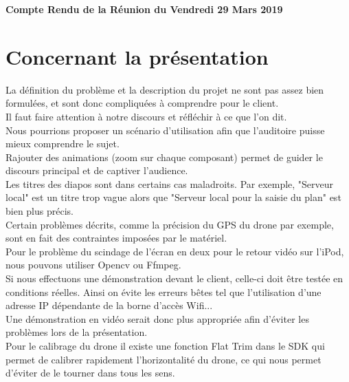 \documentclass[]{article}
\begin{document}
\pagestyle{fancy}
\renewcommand\headrulewidth{1pt}
\renewcommand\footrulewidth{1pt}

\begin{center}
\large{\textbf{Compte Rendu de la Réunion du Vendredi 29 Mars 2019 \bigbreak}}
\end{center}

\section{Concernant la présentation}
La définition du problème et la description du projet ne sont pas assez bien formulées, et sont donc compliquées à comprendre pour le client.\\
Il faut faire attention à notre discours et réfléchir à ce que l'on dit.\\
Nous pourrions proposer un scénario d'utilisation afin que l'auditoire puisse mieux comprendre le sujet.\\
Rajouter des animations (zoom sur chaque composant) permet de guider le discours principal et de captiver l'audience.\\

Les titres des diapos sont dans certains cas maladroits. Par exemple, "Serveur local" est un titre trop vague alors que "Serveur local pour la saisie du plan" est bien plus précis.\\
Certain problèmes décrits, comme la précision du GPS du drone par exemple, sont en fait des contraintes imposées par le matériel.\\
Pour le problème du scindage de l'écran en deux pour le retour vidéo sur l'iPod, nous pouvons utiliser Opencv ou Ffmpeg.\\
Si nous effectuons une démonstration devant le client, celle-ci doit être testée en conditions réelles. Ainsi on évite les erreurs bêtes tel que l'utilisation d'une adresse IP dépendante de la borne d'accès Wifi...\\
Une démonstration en vidéo serait donc plus appropriée afin d'éviter les problèmes lors de la présentation.\\
Pour le calibrage du drone il existe une fonction Flat Trim dans le SDK qui permet de calibrer rapidement l'horizontalité du drone, ce qui nous permet d'éviter de le tourner dans tous les sens.

 
\end{document}
